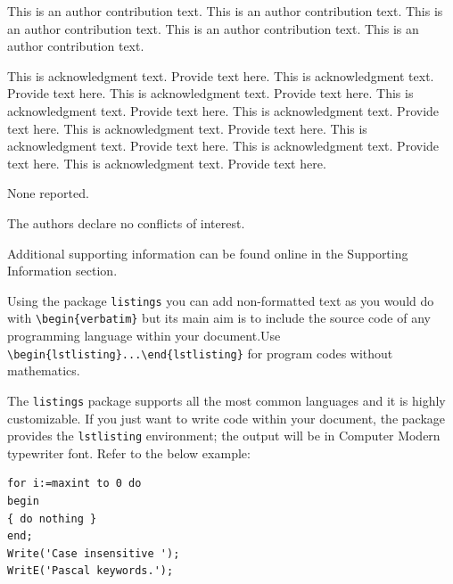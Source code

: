 \documentclass[ASNA,twocolumn]{USG} %
\begin{document}
{%
{}

This is an author contribution text. This is an author contribution text. This is an author contribution text. This is an author contribution text. This is an author contribution text.

This is acknowledgment text. \cite{Kenamond2013} Provide text here. This is acknowledgment text. Provide text here. This is acknowledgment text. Provide text here. This is acknowledgment text. Provide text here. This is acknowledgment text. Provide text here. This is acknowledgment text. Provide text here. This is acknowledgment text. Provide text here. This is acknowledgment text. Provide text here. This is acknowledgment text. Provide text here.


None reported.


The authors declare no conflicts of interest.


Additional supporting information can be found online in the Supporting Information
section.





\appendix

\vspace*{12pt}
Using the package {\tt listings} you can add non-formatted text as you would do with \verb|\begin{verbatim}| but its main aim is to include the source code of any programming language within your document.\newline Use \verb|\begin{lstlisting}...\end{lstlisting}| for program codes without mathematics.

The {\tt listings} package supports all the most common languages and it is highly customizable. If you just want to write code within your document, the package provides the {\tt lstlisting} environment; the output will be in Computer Modern typewriter font. Refer to the below example:


\begin{lstlisting}[caption={Descriptive caption text},label=DescriptiveLabel, basicstyle=\fontsize{8}{10}\selectfont\ttfamily]
for i:=maxint to 0 do
begin
{ do nothing }
end;
Write('Case insensitive ');
WritE('Pascal keywords.');
\end{lstlisting}



}
\end{document}
